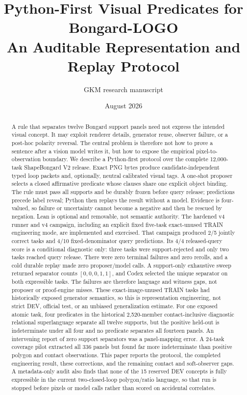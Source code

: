 \documentclass[11pt]{article}
\title{Python-First Visual Predicates for Bongard-LOGO\\
       An Auditable Representation and Replay Protocol}
\author{GKM research manuscript}
\date{August 2026}
\begin{document}
\maketitle

\begin{abstract}
A rule that separates twelve Bongard support panels need not express the
intended visual concept.  It may exploit renderer details, generator reuse,
observer failure, or a post-hoc polarity reversal.  The central problem is
therefore not how to prove a sentence after a vision model writes it, but how
to expose the empirical pixel-to-observation boundary.  We describe a
Python-first protocol over the complete 12,000-task ShapeBongard V2 release.
Exact PNG bytes produce candidate-independent typed loop packets and,
optionally, neutral calibrated visual tags.  A one-shot proposer selects a
closed affirmative predicate whose clauses share one explicit object binding.
The rule must pass all supports and be durably frozen before query release;
predictions precede label reveal; Python then replays the result without a
model.  Evidence is four-valued, so failure or uncertainty cannot become a
negative and then be rescued by negation.  Lean is optional and removable, not
semantic authority.  The hardened v4 runner and v4 campaign, including an
explicit fixed five-task exact-unused TRAIN engineering mode, are
implemented and exercised.  That campaign produced 2/5 jointly correct tasks
and 4/10 fixed-denominator query predictions.  Its 4/4 released-query score is
a conditional diagnostic only: three tasks were support-rejected and only two
tasks reached query release.  There were zero terminal failures and zero
rerolls, and a cold durable replay made zero proposer/model calls.  A
support-only exhaustive
sweep returned separator counts $[0,0,0,1,1]$, and Codex selected the unique
separator on both expressible tasks.  The failures are therefore language and
witness gaps, not proposer or proof-engine misses.  These exact-image-unused
TRAIN tasks had historically exposed generator semantics, so this is
representation engineering, not strict DEV, official test, or an unbiased
generalization estimate.  For one exposed atomic task, four predicates in the
historical
2,520-member contact-inclusive diagnostic relational superlanguage separate
all twelve supports, but the
positive held-out is indeterminate under all four and no predicate separates
all fourteen panels.
An intervening report of zero support separators was a panel-mapping error.
A 24-task coverage pilot extracted all 336 panels but found far more
indeterminate than positive polygon and contact observations.  This paper
reports the protocol, the completed engineering result, these corrections,
and the remaining contact and soft-observer gaps.  A metadata-only audit also
finds that none of the 15 reserved DEV concepts is fully expressible in the
current two-closed-loop polygon/ratio language, so that run is stopped before
pixels or model calls rather than scored on accidental correlates.
\end{abstract}
\end{document}
